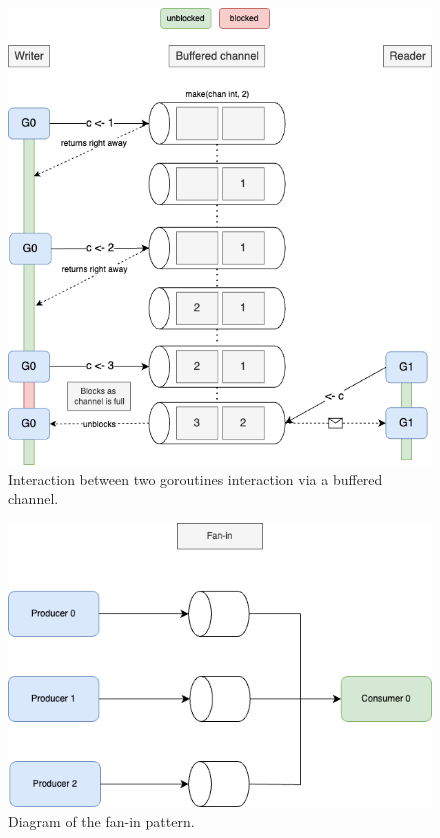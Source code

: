 \documentclass[
  digital,
  color,
  oneside,
  nosansbold,
  nocolorbold,
  lof,
  lot,
]{fithesis4}
\begin{document}
\begin{figure}[H]
    \centering
    \includegraphics[width=12cm]{figures/buffered-full.png}
    \caption{Interaction between two goroutines interaction via a buffered channel.}
\end{figure}

\begin{figure}[H]
    \centering
    \includegraphics[width=12cm]{figures/fanin.png}
    \caption{Diagram of the fan-in pattern.}
\end{figure}
\end{document}
